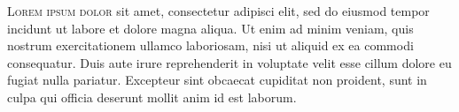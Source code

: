 \documentclass{unicam_thesis}
\theoremstyle{definition} \newtheorem{esempio}{Esempio}[chapter]
\theoremstyle{definition}
\begin{document}
    
    \textsc{Lorem ipsum dolor} sit amet, consectetur adipisci elit, sed do eiusmod tempor incidunt ut labore et dolore magna aliqua. Ut enim ad minim veniam, quis nostrum exercitationem ullamco laboriosam, nisi ut aliquid ex ea commodi consequatur. Duis aute irure reprehenderit in voluptate velit esse cillum dolore eu fugiat nulla pariatur. Excepteur sint obcaecat cupiditat non proident, sunt in culpa qui officia deserunt mollit anim id est laborum.
    
    
    
    
    
    \nocite{*} 
    \cleardoublepage
    
    
    
    
    
    
    \printindex
    
    
    
    
\end{document}
